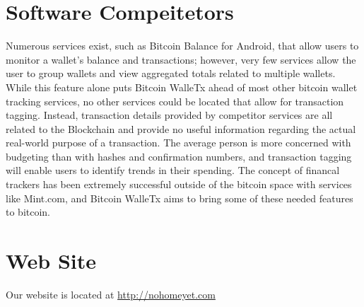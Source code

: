 \documentclass[12pt]{article}
\begin{document}
  \section{Software Compeitetors}

  \normalsize{Numerous services exist, such as Bitcoin Balance for Android, that allow users to monitor a wallet's balance and transactions; however, very few services allow the user to group wallets and view aggregated totals related to multiple wallets. While this feature alone puts Bitcoin WalleTx ahead of most other bitcoin wallet tracking services, no other services could be located that allow for transaction tagging. Instead, transaction details provided by competitor services are all related to the Blockchain and provide no useful information regarding the actual real-world purpose of a transaction. The average person is more concerned with budgeting than with hashes and confirmation numbers, and transaction tagging will enable users to identify trends in their spending. The concept of financal trackers has been extremely successful outside of the bitcoin space with services like Mint.com, and Bitcoin WalleTx aims to bring some of these needed features to bitcoin.}\\ 


  \section{Web Site}
  Our website is located at \url{http://nohomeyet.com}
\end{document}
